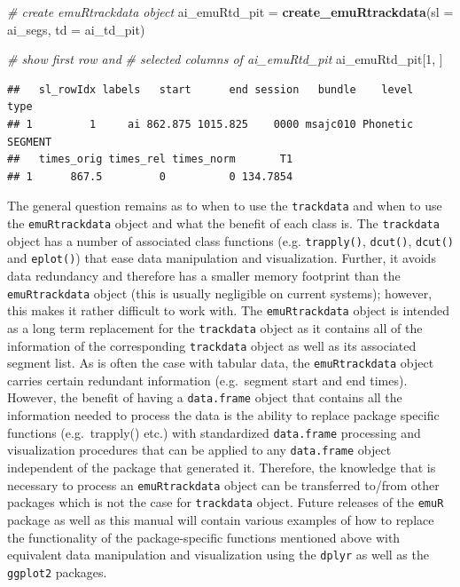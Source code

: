 \documentclass[]{book}
\newenvironment{Shaded}{\begin{snugshade}}{\end{snugshade}}
\newcommand{\CommentTok}[1]{\textcolor[rgb]{0.56,0.35,0.01}{\textit{#1}}}
\newcommand{\DataTypeTok}[1]{\textcolor[rgb]{0.13,0.29,0.53}{#1}}
\newcommand{\DecValTok}[1]{\textcolor[rgb]{0.00,0.00,0.81}{#1}}
\newcommand{\KeywordTok}[1]{\textcolor[rgb]{0.13,0.29,0.53}{\textbf{#1}}}
\newcommand{\NormalTok}[1]{#1}
\newcommand{\StringTok}[1]{\textcolor[rgb]{0.31,0.60,0.02}{#1}}
\theoremstyle{definition}
\theoremstyle{definition}
\theoremstyle{definition}
\theoremstyle{remark}
\begin{document}
\begin{Shaded}
\begin{Highlighting}[]
\CommentTok{# create emuRtrackdata object}
\NormalTok{ai_emuRtd_pit  =}\StringTok{ }\KeywordTok{create_emuRtrackdata}\NormalTok{(}\DataTypeTok{sl =}\NormalTok{ ai_segs,}
                                      \DataTypeTok{td =}\NormalTok{ ai_td_pit)}

\CommentTok{# show first row and}
\CommentTok{# selected columns of ai_emuRtd_pit}
\NormalTok{ai_emuRtd_pit[}\DecValTok{1}\NormalTok{, ]}
\end{Highlighting}
\end{Shaded}

\begin{verbatim}
##   sl_rowIdx labels   start      end session   bundle    level    type
## 1         1     ai 862.875 1015.825    0000 msajc010 Phonetic SEGMENT
##   times_orig times_rel times_norm       T1
## 1      867.5         0          0 134.7854
\end{verbatim}

The general question remains as to when to use the \texttt{trackdata}
and when to use the \texttt{emuRtrackdata} object and what the benefit
of each class is. The \texttt{trackdata} object has a number of
associated class functions (e.g. \texttt{trapply()}, \texttt{dcut()},
\texttt{dcut()} and \texttt{eplot()}) that ease data manipulation and
visualization. Further, it avoids data redundancy and therefore has a
smaller memory footprint than the \texttt{emuRtrackdata} object (this is
usually negligible on current systems); however, this makes it rather
difficult to work with. The \texttt{emuRtrackdata} object is intended as
a long term replacement for the \texttt{trackdata} object as it contains
all of the information of the corresponding \texttt{trackdata} object as
well as its associated segment list. As is often the case with tabular
data, the \texttt{emuRtrackdata} object carries certain redundant
information (e.g.~segment start and end times). However, the benefit of
having a \texttt{data.frame} object that contains all the information
needed to process the data is the ability to replace package specific
functions (e.g.~trapply() etc.) with standardized \texttt{data.frame}
processing and visualization procedures that can be applied to any
\texttt{data.frame} object independent of the package that generated it.
Therefore, the knowledge that is necessary to process an
\texttt{emuRtrackdata} object can be transferred to/from other packages
which is not the case for \texttt{trackdata} object. Future releases of
the \texttt{emuR} package as well as this manual will contain various
examples of how to replace the functionality of the package-specific
functions mentioned above with equivalent data manipulation and
visualization using the \texttt{dplyr} as well as the \texttt{ggplot2}
packages.
\end{document}

